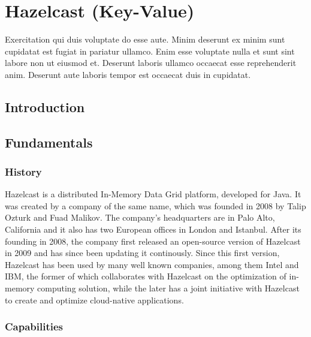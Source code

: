 
\chapter{Hazelcast (Key-Value)} \label{ch:hazelcast}

Exercitation qui duis voluptate do esse aute. Minim deserunt ex minim sunt cupidatat est fugiat in pariatur ullamco. Enim esse voluptate nulla et sunt sint labore non ut eiusmod et. Deserunt laboris ullamco occaecat esse reprehenderit anim. Deserunt aute laboris tempor est occaecat duis in cupidatat.

\section{Introduction} \label{sec:introductionHazelcast}

\section{Fundamentals} \label{sec:fundamentalsHazelcast}
\subsection{History} \label{subsec:historyHazelcast}
Hazelcast is a distributed In-Memory Data Grid platform, developed for Java. It was created by a company of the same name, 
which was founded in 2008 by Talip Ozturk and Fuad Malikov. \cite{DatabaseofDatabases.11032023} The company's headquarters are 
in Palo Alto, California and it also has two European offices in London and Istanbul. \cite{HazelcastContact.03112022} \newline
After its founding in 2008, the company first released an open-source version of Hazelcast in 2009 and has since been updating it 
continously. \cite{DatabaseofDatabases.11032023} Since this first version, Hazelcast has been used by many well known companies, 
among them Intel and IBM, the former of which collaborates with Hazelcast on the optimization of in-memory computing solution, while 
the later has a joint initiative with Hazelcast to create and optimize cloud-native applications. \cite{HazelcastPartners.270122}
\subsection{Capabilities} \label{subsec:capabilitiesHazelcast}


